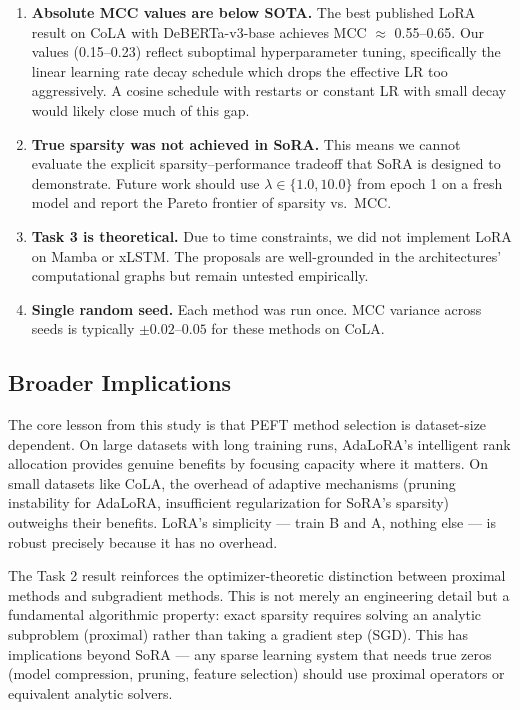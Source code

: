\documentclass[12pt,a4paper]{article}
\theoremstyle{definition}
\begin{document}
\begin{enumerate}
    \item \textbf{Absolute MCC values are below SOTA.} The best published LoRA result on CoLA with DeBERTa-v3-base achieves MCC $\approx$ 0.55--0.65. Our values (0.15--0.23) reflect suboptimal hyperparameter tuning, specifically the linear learning rate decay schedule which drops the effective LR too aggressively. A cosine schedule with restarts or constant LR with small decay would likely close much of this gap.
    
    \item \textbf{True sparsity was not achieved in SoRA.} This means we cannot evaluate the explicit sparsity--performance tradeoff that SoRA is designed to demonstrate. Future work should use $\lambda \in \{1.0, 10.0\}$ from epoch 1 on a fresh model and report the Pareto frontier of sparsity vs.\ MCC.
    
    \item \textbf{Task 3 is theoretical.} Due to time constraints, we did not implement LoRA on Mamba or xLSTM. The proposals are well-grounded in the architectures' computational graphs but remain untested empirically.
    
    \item \textbf{Single random seed.} Each method was run once. MCC variance across seeds is typically $\pm 0.02$--$0.05$ for these methods on CoLA.
\end{enumerate}

\subsection{Broader Implications}

The core lesson from this study is that PEFT method selection is dataset-size dependent. On large datasets with long training runs, AdaLoRA's intelligent rank allocation provides genuine benefits by focusing capacity where it matters. On small datasets like CoLA, the overhead of adaptive mechanisms (pruning instability for AdaLoRA, insufficient regularization for SoRA's sparsity) outweighs their benefits. LoRA's simplicity — train B and A, nothing else — is robust precisely because it has no overhead.

The Task 2 result reinforces the optimizer-theoretic distinction between proximal methods and subgradient methods. This is not merely an engineering detail but a fundamental algorithmic property: exact sparsity requires solving an analytic subproblem (proximal) rather than taking a gradient step (SGD). This has implications beyond SoRA — any sparse learning system that needs true zeros (model compression, pruning, feature selection) should use proximal operators or equivalent analytic solvers.
\end{document}
